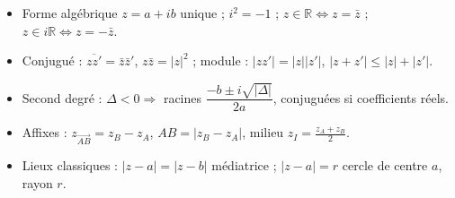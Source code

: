 \documentclass[11pt,a4paper]{article}
\begin{document}
\vspace{4mm}
\begin{tcolorbox}[
  enhanced, boxrule=0pt, arc=2mm,
  interior style={left color=qtealdark, right color=qteal},
  left=6mm, right=6mm, top=4mm, bottom=4mm,
  fontupper=\color{white}\sffamily,
  title={\sffamily\bfseries\color{white}\ding{72}~~À retenir},
  colbacktitle=qtealdark, coltitle=white, boxrule=0pt
]
\begin{itemize}[leftmargin=6mm, label={\color{qamber}}, itemsep=1mm]
  \item Forme algébrique $z=a+ib$ unique ; $i^2=-1$ ; $z\in\mathbb{R}\iff z=\bar z$ ; $z\in i\mathbb{R}\iff z=-\bar z$.
  \item Conjugué : $\overline{zz'}=\bar z\bar z'$, $z\bar z=|z|^2$ ; module : $|zz'|=|z||z'|$, $|z+z'|\leq|z|+|z'|$.
  \item Second degré : $\Delta<0\Rightarrow$ racines $\dfrac{-b\pm i\sqrt{|\Delta|}}{2a}$, conjuguées si coefficients réels.
  \item Affixes : $z_{\overrightarrow{AB}}=z_B-z_A$, $AB=|z_B-z_A|$, milieu $z_I=\frac{z_A+z_B}2$.
  \item Lieux classiques : $|z-a|=|z-b|$ médiatrice ; $|z-a|=r$ cercle de centre $a$, rayon $r$.
\end{itemize}
\end{tcolorbox}
\end{document}
